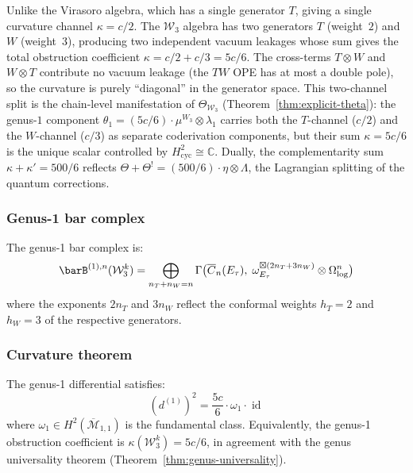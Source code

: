 Unlike the Virasoro algebra, which has a single generator $T$, giving a single
curvature channel $\kappa = c/2$.  The $\mathcal{W}_3$ algebra has two
generators $T$ (weight~$2$) and $W$ (weight~$3$), producing two
independent vacuum leakages whose sum gives the total obstruction
coefficient $\kappa = c/2 + c/3 = 5c/6$.  The cross-terms
$T \otimes W$ and $W \otimes T$ contribute no vacuum leakage
(the $TW$ OPE has at most a double pole), so the curvature is
purely ``diagonal'' in the generator space.
This two-channel split is the chain-level manifestation of
$\Theta_{\mathcal{W}_3}$ (Theorem~\ref{thm:explicit-theta}):
the genus-$1$ component $\theta_1 = (5c/6) \cdot \mu^{W_3}
\otimes \lambda_1$ carries both the $T$-channel ($c/2$) and the
$W$-channel ($c/3$) as separate coderivation components,
but their sum $\kappa = 5c/6$ is the unique scalar
controlled by $H^2_{\mathrm{cyc}} \cong \mathbb{C}$.
Dually, the complementarity sum $\kappa + \kappa' = 500/6$
reflects $\Theta + \Theta^! = (500/6) \cdot \eta \otimes \Lambda$,
the Lagrangian splitting of the quantum corrections.

\subsubsection{Genus-1 bar complex}

The genus-1 bar complex is:
\begin{equation}\label{eq:w3-genus1-bar}
\barB^{(1),n}(\mathcal{W}_3^k) = \bigoplus_{n_T + n_W = n}
  \Gamma\bigl(\overline{C}_n(E_\tau),\;
  \omega_{E_\tau}^{\boxtimes(2n_T + 3n_W)} \otimes \Omega^n_{\log}\bigr)
\end{equation}
where the exponents $2n_T$ and $3n_W$ reflect the conformal weights
$h_T = 2$ and $h_W = 3$ of the respective generators.

\subsubsection{Curvature theorem}

\begin{theorem}
\label{thm:w3-genus1-curvature}
The genus-1 differential satisfies:
\begin{equation}\label{eq:w3-genus1-dsquared}
(d^{(1)})^2 = \frac{5c}{6} \cdot \omega_1 \cdot \operatorname{id}
\end{equation}
where $\omega_1 \in H^2(\overline{\mathcal{M}}_{1,1})$ is the fundamental
class.  Equivalently, the genus-1 obstruction coefficient is
$\kappa(\mathcal{W}_3^k) = 5c/6$, in agreement with the genus universality
theorem (Theorem~\ref{thm:genus-universality}).
\end{theorem}

